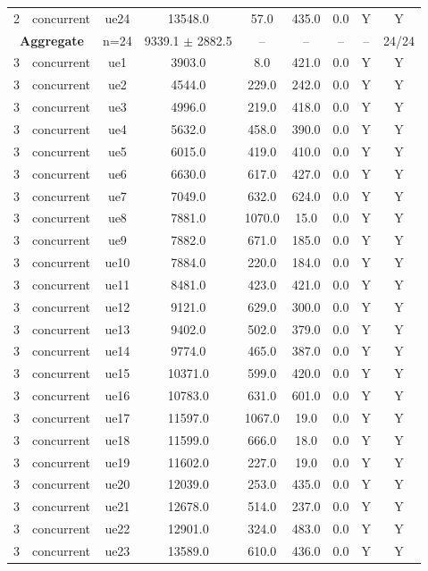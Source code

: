 \begin{table}[ht]
\begin{tabular}{|c|c|c|c|c|c|c|c|c|}
2 & concurrent & ue24 & 13548.0 & 57.0 & 435.0 & 0.0 & Y & Y \\
\multicolumn{2}{|c|}{\textbf{Aggregate}} & n=24 & 9339.1 $\pm$ 2882.5 & -- & -- & -- & -- & 24/24 \\
\hline
3 & concurrent & ue1 & 3903.0 & 8.0 & 421.0 & 0.0 & Y & Y \\
3 & concurrent & ue2 & 4544.0 & 229.0 & 242.0 & 0.0 & Y & Y \\
3 & concurrent & ue3 & 4996.0 & 219.0 & 418.0 & 0.0 & Y & Y \\
3 & concurrent & ue4 & 5632.0 & 458.0 & 390.0 & 0.0 & Y & Y \\
3 & concurrent & ue5 & 6015.0 & 419.0 & 410.0 & 0.0 & Y & Y \\
3 & concurrent & ue6 & 6630.0 & 617.0 & 427.0 & 0.0 & Y & Y \\
3 & concurrent & ue7 & 7049.0 & 632.0 & 624.0 & 0.0 & Y & Y \\
3 & concurrent & ue8 & 7881.0 & 1070.0 & 15.0 & 0.0 & Y & Y \\
3 & concurrent & ue9 & 7882.0 & 671.0 & 185.0 & 0.0 & Y & Y \\
3 & concurrent & ue10 & 7884.0 & 220.0 & 184.0 & 0.0 & Y & Y \\
3 & concurrent & ue11 & 8481.0 & 423.0 & 421.0 & 0.0 & Y & Y \\
3 & concurrent & ue12 & 9121.0 & 629.0 & 300.0 & 0.0 & Y & Y \\
3 & concurrent & ue13 & 9402.0 & 502.0 & 379.0 & 0.0 & Y & Y \\
3 & concurrent & ue14 & 9774.0 & 465.0 & 387.0 & 0.0 & Y & Y \\
3 & concurrent & ue15 & 10371.0 & 599.0 & 420.0 & 0.0 & Y & Y \\
3 & concurrent & ue16 & 10783.0 & 631.0 & 601.0 & 0.0 & Y & Y \\
3 & concurrent & ue17 & 11597.0 & 1067.0 & 19.0 & 0.0 & Y & Y \\
3 & concurrent & ue18 & 11599.0 & 666.0 & 18.0 & 0.0 & Y & Y \\
3 & concurrent & ue19 & 11602.0 & 227.0 & 19.0 & 0.0 & Y & Y \\
3 & concurrent & ue20 & 12039.0 & 253.0 & 435.0 & 0.0 & Y & Y \\
3 & concurrent & ue21 & 12678.0 & 514.0 & 237.0 & 0.0 & Y & Y \\
3 & concurrent & ue22 & 12901.0 & 324.0 & 483.0 & 0.0 & Y & Y \\
3 & concurrent & ue23 & 13589.0 & 610.0 & 436.0 & 0.0 & Y & Y \\

\end{tabular}
\end{table}
